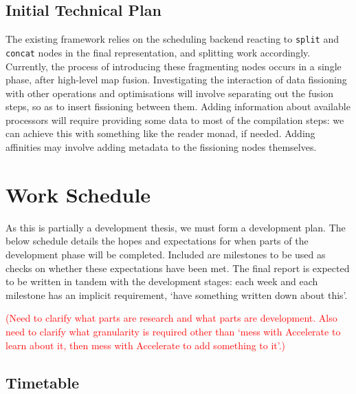 \documentclass[a4paper,12pt]{article}
\newcommand{\red}[1]{\textcolor{red}{#1}}
\newcommand{\icf}[1]{\mbox{\texttt{#1}}} %
\begin{document}
\subsection{Initial Technical Plan}
The existing framework relies on the scheduling backend reacting to \icf{split} and \icf{concat} nodes in the final representation, and splitting work accordingly.
Currently, the process of introducing these fragmenting nodes occurs in a single phase, after high-level map fusion.
Investigating the interaction of data fissioning with other operations and optimisations will involve separating out the fusion steps, so as to insert fissioning between them.
Adding information about available processors will require providing some data to most of the compilation steps: we can achieve this with something like the reader monad, if needed.
Adding affinities may involve adding metadata to the fissioning nodes themselves.

\section{Work Schedule}
As this is partially a development thesis, we must form a development plan.
The below schedule details the hopes and expectations for when parts of the development phase will be completed.
Included are milestones to be used as checks on whether these expectations have been met.
The final report is expected to be written in tandem with the development stages: each week and each milestone has an implicit requirement, `have something written down about this'.

\red{(Need to clarify what parts are research and what parts are development. Also need to clarify what granularity is required other than `mess with Accelerate to learn about it, then mess with Accelerate to add something to it'.)}

\subsection{Timetable}
\end{document}
